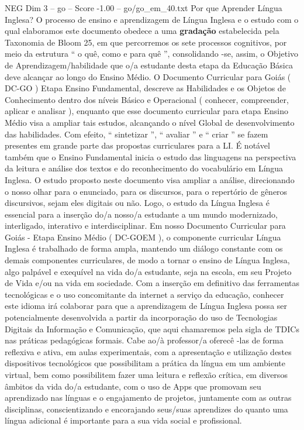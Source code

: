 \begin{textsample}{NEG Dim 3 – go – Score -1.00 – go/go\_em\_40.txt}  \label{ex:f3_neg_245}
Por que Aprender Língua Inglesa?
O processo de ensino e aprendizagem de Língua Inglesa e o estudo com o qual elaboramos este documento obedece a uma \textbf{gradação} estabelecida pela Taxonomia de Bloom 25, em que percorremos os sete processos cognitivos, por meio da estrutura “ o quê, como e para quê ”, consolidando -se, assim, o Objetivo de Aprendizagem/habilidade que o/a estudante desta etapa da Educação Básica deve alcançar ao longo do Ensino Médio.
O Documento Curricular para Goiás ( DC-GO ) Etapa Ensino Fundamental, descreve as Habilidades e os Objetos de Conhecimento dentro dos níveis Básico e Operacional ( conhecer, compreender, aplicar e analisar ), enquanto que esse documento curricular para etapa Ensino Médio visa a ampliar tais estudos, alcançando o nível Global de desenvolvimento das habilidades.
Com efeito, “ sintetizar ”, “ avaliar ” e “ criar ” se fazem presentes em grande parte das propostas curriculares para a LI.
É notável também que o Ensino Fundamental inicia o estudo das linguagens na perspectiva da leitura e análise dos textos e do reconhecimento do vocabulário em Língua Inglesa.
O estudo proposto neste documento visa ampliar a análise, direcionando o nosso olhar para o enunciado, para os discursos, para o repertório de gêneros discursivos, sejam eles digitais ou não.
Logo, o estudo da Língua Inglesa é essencial para a inserção do/a nosso/a estudante a um mundo modernizado, interligado, interativo e interdisciplinar.
Em nosso Documento Curricular para Goiás - Etapa Ensino Médio ( DC-GOEM ), o componente curricular Língua Inglesa é trabalhado de forma ampla, mantendo um diálogo constante com os demais componentes curriculares, de modo a tornar o ensino de Língua Inglesa, algo palpável e exequível na vida do/a estudante, seja na escola, em seu Projeto de Vida e/ou na vida em sociedade.
Com a inserção em definitivo das ferramentas tecnológicas e o uso concomitante da internet a serviço da educação, conhecer este idioma irá colaborar para que a aprendizagem de Língua Inglesa possa ser potencialmente desenvolvida a partir da incorporação do uso de Tecnologias Digitais da Informação e Comunicação, que aqui chamaremos pela sigla de TDICs nas práticas pedagógicas formais.
Cabe ao/à professor/a oferecê -las de forma reflexiva e ativa, em aulas experimentais, com a apresentação e utilização destes dispositivos tecnológicos que possibilitam a prática da língua em um ambiente virtual, bem como possibilitem fazer uma leitura e reflexão crítica, em diversos âmbitos da vida do/a estudante, com o uso de Apps que promovam seu aprendizado nas línguas e o engajamento de projetos, juntamente com as outras disciplinas, conscientizando e encorajando seus/suas aprendizes do quanto uma língua adicional é importante para a sua vida social e profissional.

\end{textsample}
